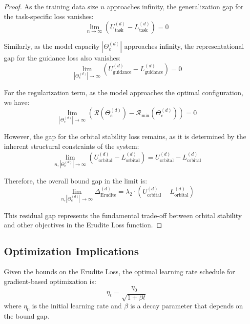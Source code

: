 \begin{proof}
As the training data size $n$ approaches infinity, the generalization gap for the task-specific loss vanishes:
\begin{equation}
\lim_{n \to \infty} \left(U_{\text{task}}^{(d)} - L_{\text{task}}^{(d)}\right) = 0
\end{equation}

Similarly, as the model capacity $|\Theta_e^{(d)}|$ approaches infinity, the representational gap for the guidance loss also vanishes:
\begin{equation}
\lim_{|\Theta_e^{(d)}| \to \infty} \left(U_{\text{guidance}}^{(d)} - L_{\text{guidance}}^{(d)}\right) = 0
\end{equation}

For the regularization term, as the model approaches the optimal configuration, we have:
\begin{equation}
\lim_{|\Theta_e^{(d)}| \to \infty} \left(\mathcal{R}(\Theta_e^{(d)}) - \mathcal{R}_{\text{min}}(\Theta_e^{(d)})\right) = 0
\end{equation}

However, the gap for the orbital stability loss remains, as it is determined by the inherent structural constraints of the system:
\begin{equation}
\lim_{n,|\Theta_e^{(d)}| \to \infty} \left(U_{\text{orbital}}^{(d)} - L_{\text{orbital}}^{(d)}\right) = U_{\text{orbital}}^{(d)} - L_{\text{orbital}}^{(d)}
\end{equation}

Therefore, the overall bound gap in the limit is:
\begin{equation}
\lim_{n,|\Theta_e^{(d)}| \to \infty} \Delta_{\text{Erudite}}^{(d)} = \lambda_2 \cdot \left(U_{\text{orbital}}^{(d)} - L_{\text{orbital}}^{(d)}\right)
\end{equation}

This residual gap represents the fundamental trade-off between orbital stability and other objectives in the Erudite Loss function.
\end{proof}

\subsection{Optimization Implications}

\begin{theorem}
Given the bounds on the Erudite Loss, the optimal learning rate schedule for gradient-based optimization is:
\begin{equation}
\eta_t = \frac{\eta_0}{\sqrt{1 + \beta t}}
\end{equation}
where $\eta_0$ is the initial learning rate and $\beta$ is a decay parameter that depends on the bound gap.
\end{theorem}


